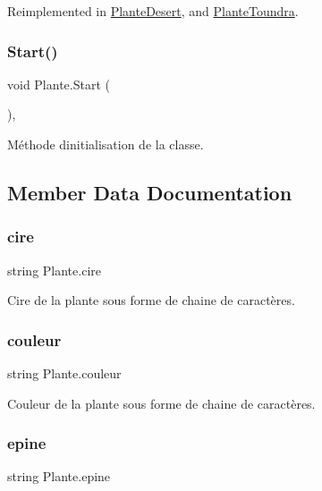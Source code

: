 Reimplemented in \mbox{\hyperlink{class_plante_desert_a2808030edc2d59ca22c4311db64e2a7c}{Plante\+Desert}}, and \mbox{\hyperlink{class_plante_toundra_a6700c5afd0e5d37801cf2962c7ce929b}{Plante\+Toundra}}.

\mbox{\label{class_plante_a3122e53122617f91347210bd4011b123}} 
\subsubsection{\texorpdfstring{Start()}{Start()}}
{\footnotesize\ttfamily void Plante.\+Start (\begin{DoxyParamCaption}{ }\end{DoxyParamCaption})\hspace{0.3cm}{\ttfamily [inline]}, {\ttfamily [private]}}

Méthode d\textquotesingle{}initialisation de la classe. 

\subsection{Member Data Documentation}
\mbox{\label{class_plante_a036a4950846e298397513d996edfb181}} 
\subsubsection{\texorpdfstring{cire}{cire}}
{\footnotesize\ttfamily string Plante.\+cire}

Cire de la plante sous forme de chaine de caractères. \mbox{\label{class_plante_a958eb820071675fab9b6954023ca6cf4}} 
\subsubsection{\texorpdfstring{couleur}{couleur}}
{\footnotesize\ttfamily string Plante.\+couleur}

Couleur de la plante sous forme de chaine de caractères. \mbox{\label{class_plante_a5a3be50e6316f5514226d76875e14c63}} 
\subsubsection{\texorpdfstring{epine}{epine}}
{\footnotesize\ttfamily string Plante.\+epine}

